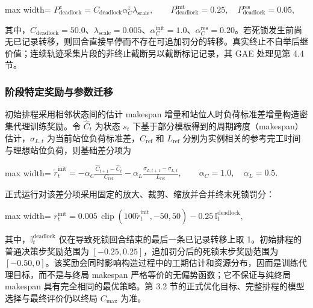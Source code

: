 \documentclass[journal,10pt]{IEEEtran}
\begin{document}
\begin{center}
\begin{adjustbox}{max width=\columnwidth}
$\displaystyle
P_{\mathrm{deadlock}}^{z}
=C_{\mathrm{deadlock}}\alpha_C^{z}\lambda_{\mathrm{scale}},
\qquad
P_{\mathrm{deadlock}}^{\mathrm{init}}=0.25,
\quad
P_{\mathrm{deadlock}}^{\mathrm{res}}=0.05,
$
\end{adjustbox}
\end{center}

其中，\(C_{\mathrm{deadlock}}=50.0\)、\(\lambda_{\mathrm{scale}}=0.005\)、\(\alpha_C^{\mathrm{init}}=1.0\)、\(\alpha_C^{\mathrm{res}}=0.20\)。若死锁发生前尚无已记录转移，则回合直接早停而不存在可追加罚分的转移。真实终止不自举后继价值；连续轨迹采集片段的非终止截断另以截断标记记录，其 GAE 处理见第 4.4 节。

\subsubsection{阶段特定奖励与参数迁移}\label{ux9636ux6bb5ux7279ux5b9aux5956ux52b1ux4e0eux53c2ux6570ux8fc1ux79fb}

初始排程采用相邻状态间的估计 makespan 增量和站位人时负荷标准差增量构造密集代理训练奖励。令 \(\widehat C_t\) 为状态 \(s_t\) 下基于部分模板得到的周期跨度（makespan）估计，\(\sigma_{L,t}\) 为当前站位负荷标准差，\(C_{\mathrm{ref}}\) 和 \(L_{\mathrm{ref}}\) 分别为实例相关的参考完工时间与理想站位负荷，则基础差分项为

\begin{center}
\begin{adjustbox}{max width=\columnwidth}
$\displaystyle
\widetilde r_t^{\mathrm{init}}=
-\alpha_C
\frac{\widehat C_{t+1}-\widehat C_t}{C_{\mathrm{ref}}}
-\alpha_L
\frac{\sigma_{L,t+1}-\sigma_{L,t}}{L_{\mathrm{ref}}},
\qquad
\alpha_C=1.0,
\quad \alpha_L=0.5.
$
\end{adjustbox}
\end{center}

正式运行对该差分项采用固定的放大、裁剪、缩放并合并终末死锁罚分：

\begin{center}
\begin{adjustbox}{max width=\columnwidth}
$\displaystyle
r_t^{\mathrm{init}}=
0.005\,\operatorname{clip}
\left(100\widetilde r_t^{\mathrm{init}},-50,50\right)
-0.25\,\mathbb I_t^{\mathrm{deadlock}},
$
\end{adjustbox}
\end{center}

其中，\(\mathbb I_t^{\mathrm{deadlock}}\) 仅在导致死锁回合结束的最后一条已记录转移上取 1。初始排程的普通决策步奖励范围为 \([-0.25,0.25]\)，追加罚分后的死锁末步奖励范围为 \([-0.50,0]\)。该奖励会同时影响构造过程中的工期估计和资源分布，因而是训练代理目标，而不是与终局 makespan 严格等价的无偏势函数；它不保证与纯终局 makespan 具有完全相同的最优策略。第 3.2 节的正式优化目标、完整排程的模型选择与最终评价仍以终局 \(C_{\max}\) 为准。
\end{document}
